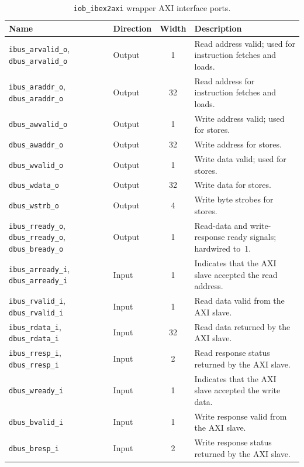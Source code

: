\begin{table}[h]
\centering
\small
\setlength{\tabcolsep}{3.2pt}
\renewcommand{\arraystretch}{1.25}
\begin{tabularx}{\textwidth}{|l|l|c|X|}
\hline
\rowcolor{tableheader}\textbf{Name} &
\textbf{Direction} &
\textbf{Width} &
\textbf{Description} \\
\hline
\hline
\texttt{ibus\_arvalid\_o}, \texttt{dbus\_arvalid\_o} &
Output & 1 &
Read address valid; used for instruction fetches and loads. \\
\hline
\texttt{ibus\_araddr\_o}, \texttt{dbus\_araddr\_o} &
Output & 32 &
Read address for instruction fetches and loads. \\
\hline
\texttt{dbus\_awvalid\_o} &
Output & 1 &
Write address valid; used for stores. \\
\hline
\texttt{dbus\_awaddr\_o} &
Output & 32 &
Write address for stores. \\
\hline
\texttt{dbus\_wvalid\_o} &
Output & 1 &
Write data valid; used for stores. \\
\hline
\texttt{dbus\_wdata\_o} &
Output & 32 &
Write data for stores. \\
\hline
\texttt{dbus\_wstrb\_o} &
Output & 4 &
Write byte strobes for stores. \\
\hline
\texttt{ibus\_rready\_o}, \texttt{dbus\_rready\_o}, \texttt{dbus\_bready\_o} &
Output & 1 &
Read-data and write-response ready signals; hardwired to~1. \\
\hline
\texttt{ibus\_arready\_i}, \texttt{dbus\_arready\_i} &
Input & 1 &
Indicates that the \ac{AXI} slave accepted the read address. \\
\hline
\texttt{ibus\_rvalid\_i}, \texttt{dbus\_rvalid\_i} &
Input & 1 &
Read data valid from the \ac{AXI} slave. \\
\hline
\texttt{ibus\_rdata\_i}, \texttt{dbus\_rdata\_i} &
Input & 32 &
Read data returned by the \ac{AXI} slave. \\
\hline
\texttt{ibus\_rresp\_i}, \texttt{dbus\_rresp\_i} &
Input & 2 &
Read response status returned by the \ac{AXI} slave. \\
\hline
\texttt{dbus\_wready\_i} &
Input & 1 &
Indicates that the \ac{AXI} slave accepted the write data. \\
\hline
\texttt{dbus\_bvalid\_i} &
Input & 1 &
Write response valid from the \ac{AXI} slave. \\
\hline
\texttt{dbus\_bresp\_i} &
Input & 2 &
Write response status returned by the \ac{AXI} slave. \\
\hline
\end{tabularx}
\caption{\texttt{iob\_ibex2axi} wrapper \ac{AXI} interface ports.}
\label{tab:ibex2axi_axi}
\end{table}


